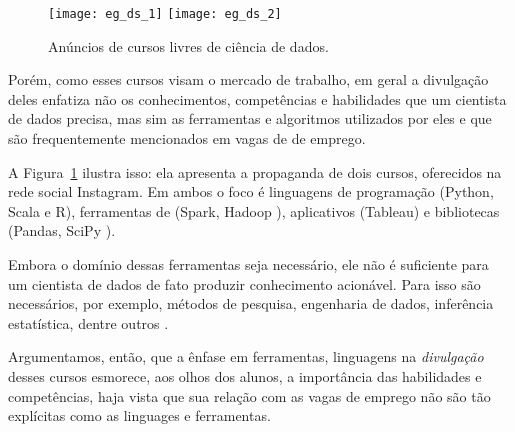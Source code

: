 \begin{figure}
	\centering

	\texttt{[image: eg\_ds\_1]}\hfill
	\texttt{[image: eg\_ds\_2]}

	\caption{Anúncios de cursos livres de ciência de dados.}
	\label{fig:cursos}
\end{figure}

Porém, como esses cursos visam o mercado de trabalho, em geral a divulgação deles enfatiza não os conhecimentos, competências e habilidades que um cientista de dados precisa, mas sim as ferramentas e algoritmos utilizados por eles e que são frequentemente mencionados em vagas de de emprego.

A Figura~\ref{fig:cursos} ilustra isso: ela apresenta a propaganda de dois cursos, oferecidos na rede social Instagram.
Em ambos o foco é linguagens de programação (Python, Scala e R), ferramentas de  (Spark, Hadoop \etc), aplicativos (Tableau) e bibliotecas (Pandas, SciPy \etc).

Embora o domínio dessas ferramentas seja necessário, ele não é suficiente para um cientista de dados de fato produzir conhecimento acionável.
Para isso são necessários, por exemplo, métodos de pesquisa, engenharia de dados, inferência estatística, dentre outros \cite[p.~15]{CF-DS-Release2019}.

Argumentamos, então, que a ênfase em ferramentas, linguagens \etc na \emph{divulgação} desses cursos esmorece, aos olhos dos alunos, a importância das habilidades e competências, haja vista que sua relação com as vagas de emprego não são tão explícitas como as linguages e ferramentas.